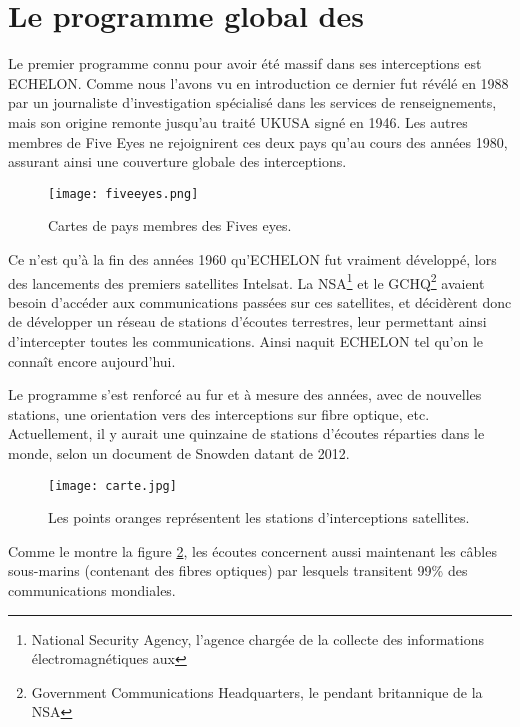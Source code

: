 \section{Le programme global des
\EUA}

Le premier programme connu pour avoir été massif dans ses
interceptions est ECHELON. Comme nous l'avons vu en introduction ce dernier fut
révélé en 1988 par un journaliste d'investigation spécialisé dans les services
de renseignements, mais son origine remonte jusqu'au traité UKUSA signé en 1946.
Les autres membres de Five Eyes ne rejoignirent ces deux pays qu'au cours des
années 1980, assurant ainsi une couverture globale des interceptions.\newline

\begin{figure}[h]
\centerline{\texttt{[image: fiveeyes.png]}}
\caption[Cartes de pays membres des Five Eyes]{Cartes de pays membres des
Fives eyes.}
\label{fig:carte}
\end{figure}

\newpage
Ce n'est qu'à la fin des années 1960\citep{ZDNET} qu'ECHELON fut
vraiment développé, lors des lancements des premiers satellites Intelsat. La
NSA\footnote{National Security Agency, l'agence chargée de la collecte des
informations électromagnétiques aux \EUA} et le GCHQ\footnote{Government
Communications Headquarters, le pendant britannique de la NSA} avaient besoin
d'accéder aux communications passées sur ces satellites, et décidèrent
donc de développer un réseau de stations d'écoutes terrestres, leur permettant
ainsi d'intercepter toutes les communications. Ainsi naquit ECHELON tel qu'on le
connaît encore aujourd'hui.\newline

Le programme s'est renforcé au fur et à mesure des années, avec de
nouvelles stations, une orientation vers des interceptions sur fibre optique,
etc. Actuellement, il y aurait une quinzaine de stations d'écoutes réparties
dans le monde, selon un document de Snowden datant de 2012\citep{Stations}.

\begin{figure}[h]
\centerline{\texttt{[image: carte.jpg]}}
\caption[Carte des stations d'interceptions]{Les points oranges
représentent les stations d'interceptions satellites.}
\label{fig:stations}
\end{figure}

Comme le montre la figure \ref{fig:stations}, les écoutes
concernent aussi maintenant les câbles sous-marins (contenant des fibres optiques) par
lesquels transitent 99\% des communications mondiales.\newline 

